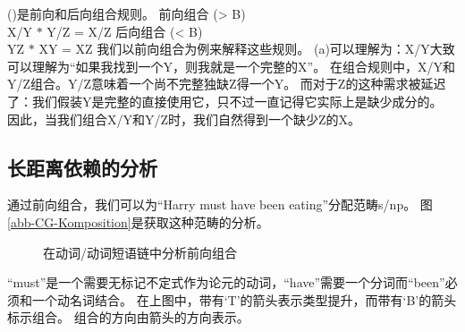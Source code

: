 ()是前向和后向组合规则。
\eal
\ex\label{Regel-Vorwaertskomposition}
 前向组合 (> B)\\
    X/Y $*$ Y/Z = X/Z 
\ex 后向组合 (< B)\\
    Y\bs Z $*$ X\bs Y = X\bs Z
\zl 
我们以前向组合为例来解释这些规则。
(a)可以理解为：X/Y大致可以理解为“如果我找到一个Y，则我就是一个完整的X”。
在组合规则中，X/Y和Y/Z组合。Y/Z意味着一个尚不完整独缺Z得一个Y。
而对于Z的这种需求被延迟了：我们假装Y是完整的直接使用它，只不过一直记得它实际上是缺少成分的。
因此，当我们组合X/Y和Y/Z时，我们自然得到一个缺少Z的X。

\subsection{长距离依赖的分析}
\label{Abschnitt-CG-UDC}

通过前向组合，我们可以为``{Harry must have been eating}''分配范畴s/np。
图\vref{abb-CG-Komposition}是获取这种范畴的分析。
\begin{figure}
\centerline{%
}
\caption{\label{abb-CG-Komposition}在动词/动词短语链中分析前向组合}
\end{figure}%
``{must}''是一个需要无标记不定式作为论元的动词，``{have}''需要一个分词而``{been}''必须和一个动名词结合。
在上图中，带有`T'的箭头表示类型提升，而带有`B'的箭头标示组合。
组合的方向由箭头的方向表示。

